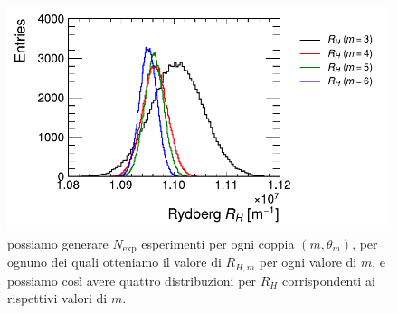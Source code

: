 \documentclass[a4paper,aps,12pt,tightenlines]{revtex4-2}
\begin{document}
\begin{figure}
\centering
\includegraphics[]{../figures_and_tests/rydberg.pdf}
\caption{possiamo generare $N_\text{exp}$ esperimenti per ogni coppia $(m, \theta_m)$, per ognuno dei quali otteniamo il valore di $R_{H,m}$ per ogni valore di $m$, e possiamo così avere quattro distribuzioni per $R_H$ corrispondenti ai rispettivi valori di $m$. \label{fig:rydberg}}
\end{figure}


\end{document}
